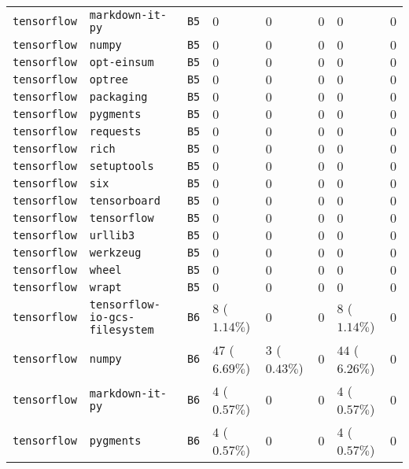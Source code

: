 \begin{table}
\begin{tabular}{llllllll}
\texttt{tensorflow} & \texttt{markdown-it-py} & \texttt{B5} & $0$ & $0$ & $0$ & $0$ & $0$ \\
\texttt{tensorflow} & \texttt{numpy} & \texttt{B5} & $0$ & $0$ & $0$ & $0$ & $0$ \\
\texttt{tensorflow} & \texttt{opt-einsum} & \texttt{B5} & $0$ & $0$ & $0$ & $0$ & $0$ \\
\texttt{tensorflow} & \texttt{optree} & \texttt{B5} & $0$ & $0$ & $0$ & $0$ & $0$ \\
\texttt{tensorflow} & \texttt{packaging} & \texttt{B5} & $0$ & $0$ & $0$ & $0$ & $0$ \\
\texttt{tensorflow} & \texttt{pygments} & \texttt{B5} & $0$ & $0$ & $0$ & $0$ & $0$ \\
\texttt{tensorflow} & \texttt{requests} & \texttt{B5} & $0$ & $0$ & $0$ & $0$ & $0$ \\
\texttt{tensorflow} & \texttt{rich} & \texttt{B5} & $0$ & $0$ & $0$ & $0$ & $0$ \\
\texttt{tensorflow} & \texttt{setuptools} & \texttt{B5} & $0$ & $0$ & $0$ & $0$ & $0$ \\
\texttt{tensorflow} & \texttt{six} & \texttt{B5} & $0$ & $0$ & $0$ & $0$ & $0$ \\
\texttt{tensorflow} & \texttt{tensorboard} & \texttt{B5} & $0$ & $0$ & $0$ & $0$ & $0$ \\
\texttt{tensorflow} & \texttt{tensorflow} & \texttt{B5} & $0$ & $0$ & $0$ & $0$ & $0$ \\
\texttt{tensorflow} & \texttt{urllib3} & \texttt{B5} & $0$ & $0$ & $0$ & $0$ & $0$ \\
\texttt{tensorflow} & \texttt{werkzeug} & \texttt{B5} & $0$ & $0$ & $0$ & $0$ & $0$ \\
\texttt{tensorflow} & \texttt{wheel} & \texttt{B5} & $0$ & $0$ & $0$ & $0$ & $0$ \\
\texttt{tensorflow} & \texttt{wrapt} & \texttt{B5} & $0$ & $0$ & $0$ & $0$ & $0$ \\
\texttt{tensorflow} & \texttt{tensorflow-io-gcs-filesystem} & \texttt{B6} & $8$ ($1.14\%$) & $0$ & $0$ & $8$ ($1.14\%$) & $0$ \\
\texttt{tensorflow} & \texttt{numpy} & \texttt{B6} & $47$ ($6.69\%$) & $3$ ($0.43\%$) & $0$ & $44$ ($6.26\%$) & $0$ \\
\texttt{tensorflow} & \texttt{markdown-it-py} & \texttt{B6} & $4$ ($0.57\%$) & $0$ & $0$ & $4$ ($0.57\%$) & $0$ \\
\texttt{tensorflow} & \texttt{pygments} & \texttt{B6} & $4$ ($0.57\%$) & $0$ & $0$ & $4$ ($0.57\%$) & $0$ \\

\end{tabular}
\end{table}
